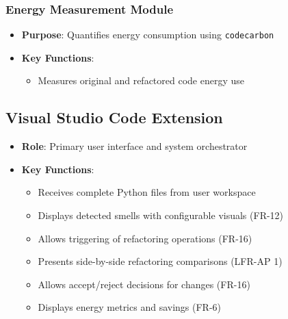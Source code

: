 \documentclass{article}
\begin{document}
\subsubsection{Energy Measurement Module}
\begin{itemize}
    \item \textbf{Purpose}: Quantifies energy consumption using \texttt{codecarbon}
    \item \textbf{Key Functions}:
    \begin{itemize}
        \item Measures original and refactored code energy use
    \end{itemize}
\end{itemize}

\subsection{Visual Studio Code Extension}
\begin{itemize}
    \item \textbf{Role}: Primary user interface and system orchestrator
    \item \textbf{Key Functions}:
    \begin{itemize}
        \item Receives complete Python files from user workspace
        \item Displays detected smells with configurable visuals (FR-12)
        \item Allows triggering of refactoring operations (FR-16)
        \item Presents side-by-side refactoring comparisons (LFR-AP 1)
        \item Allows accept/reject decisions for changes (FR-16)
        \item Displays energy metrics and savings (FR-6)
    \end{itemize}
\end{itemize}
\end{document}
